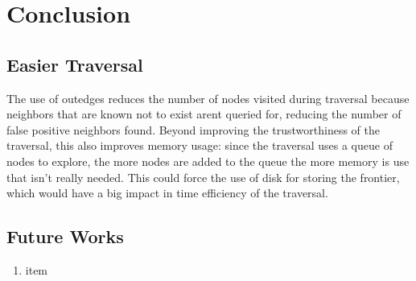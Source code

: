 \chapter{Conclusion}

\section{Easier Traversal}

The use of outedges reduces the number of nodes visited during traversal because neighbors that are known not to exist arent queried for, reducing the number of false positive neighbors found. Beyond improving the trustworthiness of the traversal, this also improves memory usage: since the traversal uses a queue of nodes to explore, the more nodes are added to the queue the more memory is use that isn't really needed. This could force the use of disk for storing the frontier, which would have a big impact in time efficiency of the traversal.

\section{Future Works}

\begin{enumerate}
\item item
\end{enumerate}